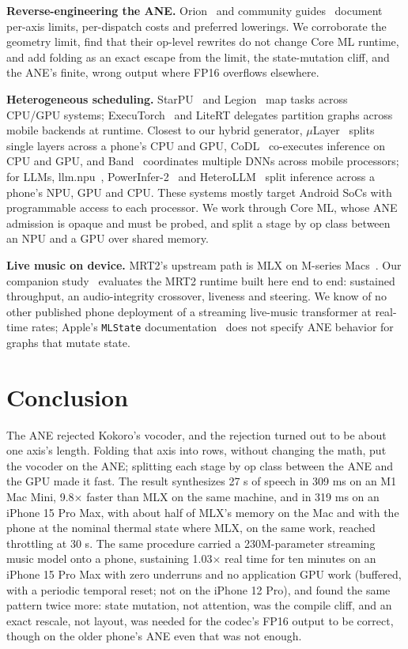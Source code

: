 \documentclass[11pt]{article}
\newcommand{\code}[1]{\texttt{#1}}
\begin{document}
\textbf{Reverse-engineering the ANE.} Orion~\citep{orion} and community guides~\citep{ane-field-guide} document per-axis limits, per-dispatch costs and preferred lowerings. We corroborate the geometry limit, find that their op-level rewrites do not change Core ML runtime, and add folding as an exact escape from the limit, the state-mutation cliff, and the ANE's finite, wrong output where FP16 overflows elsewhere.

\textbf{Heterogeneous scheduling.} StarPU~\citep{starpu} and Legion~\citep{legion} map tasks across CPU/GPU systems; ExecuTorch~\citep{executorch} and LiteRT delegates partition graphs across mobile backends at runtime. Closest to our hybrid generator, $\mu$Layer~\citep{mulayer} splits single layers across a phone's CPU and GPU, CoDL~\citep{codl} co-executes inference on CPU and GPU, and Band~\citep{band} coordinates multiple DNNs across mobile processors; for LLMs, llm.npu~\citep{llmnpu}, PowerInfer-2~\citep{powerinfer2} and HeteroLLM~\citep{heterollm} split inference across a phone's NPU, GPU and CPU. These systems mostly target Android SoCs with programmable access to each processor. We work through Core ML, whose ANE admission is opaque and must be probed, and split a stage by op class between an NPU and a GPU over shared memory.

\textbf{Live music on device.} MRT2's upstream path is MLX on M-series Macs~\citep{mrt2,magenta-rt-repo}. Our companion study~\citep{mrt2-three-clocks} evaluates the MRT2 runtime built here end to end: sustained throughput, an audio-integrity crossover, liveness and steering. We know of no other published phone deployment of a streaming live-music transformer at real-time rates; Apple's \code{MLState} documentation~\citep{mlstate} does not specify ANE behavior for graphs that mutate state.

\section{Conclusion}\label{sec:conclusion}

The ANE rejected Kokoro's vocoder, and the rejection turned out to be about one axis's length. Folding that axis into rows, without changing the math, put the vocoder on the ANE; splitting each stage by op class between the ANE and the GPU made it fast. The result synthesizes 27 s of speech in 309 ms on an M1 Mac Mini, 9.8$\times$ faster than MLX on the same machine, and in 319 ms on an iPhone 15 Pro Max, with about half of MLX's memory on the Mac and with the phone at the nominal thermal state where MLX, on the same work, reached throttling at 30 s. The same procedure carried a 230M-parameter streaming music model onto a phone, sustaining 1.03$\times$ real time for ten minutes on an iPhone 15 Pro Max with zero underruns and no application GPU work (buffered, with a periodic temporal reset; not on the iPhone 12 Pro), and found the same pattern twice more: state mutation, not attention, was the compile cliff, and an exact rescale, not layout, was needed for the codec's FP16 output to be correct, though on the older phone's ANE even that was not enough.
\end{document}
